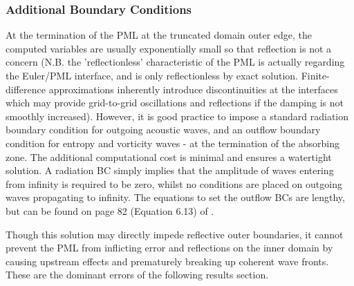 \subsubsection{Additional Boundary Conditions}

At the termination of the PML at the truncated domain outer edge, the computed  variables are usually exponentially small so that reflection is not a concern (N.B. the 'reflectionless' characteristic of the PML is actually regarding the Euler/PML interface, and is only reflectionless by exact solution. Finite-difference approximations inherently introduce discontinuities at the interfaces which may provide grid-to-grid oscillations and reflections if the damping is not smoothly increased). However, it is good practice to impose a standard radiation boundary condition for outgoing acoustic waves, and an outflow boundary condition for entropy and vorticity waves - at the termination of the absorbing zone. The additional computational cost is minimal and ensures a watertight solution. A radiation BC simply implies that the amplitude of waves entering from infinity is required to be zero, whilst no conditions are placed on outgoing waves propagating to infinity. The equations to set the outflow BCs are lengthy, but can be found on page 82 (Equation 6.13) of \textcite{tam2012computational}. 

Though this solution may directly impede reflective outer boundaries, it cannot prevent the PML from inflicting error and reflections on the inner domain by causing upstream effects and prematurely breaking up coherent wave fronts. These are the dominant errors of the following results section.

\clearpage